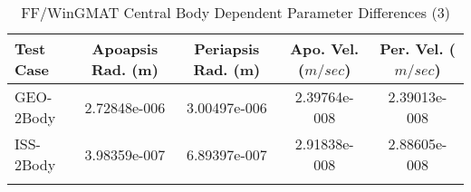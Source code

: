 \begin{table}[htbp!]
\centering
\caption{ FF/WinGMAT Central Body Dependent Parameter Differences (3)}
      \begin{tabular}{lcccc}
      \hline\hline
          Test Case & Apoapsis Rad. (m) & Periapsis Rad. (m) & Apo. Vel. ($m/sec$) & Per. Vel. ($m/sec$) \\
         \hline
         GEO-2Body & 2.72848e-006 & 3.00497e-006 & 2.39764e-008 & 2.39013e-008 \\
         ISS-2Body & 3.98359e-007 & 6.89397e-007 & 2.91838e-008 & 2.88605e-008 \\
      \hline\hline
      \label{Table: FF-WinGMAT CB Parameters Set 3} 
\end{tabular}
\end{table}
